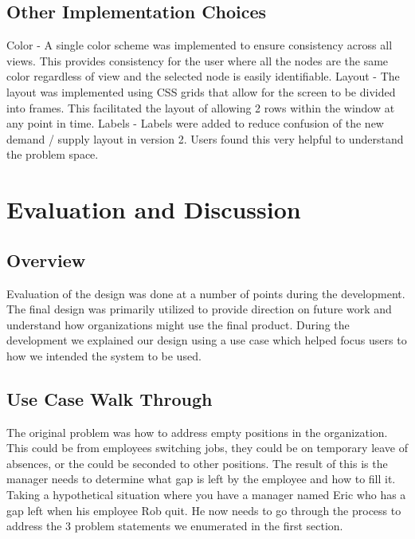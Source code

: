 \documentclass[journal]{vgtc}                %
\begin{document}
\subsection{Other Implementation Choices}
Color - A single color scheme was implemented to ensure consistency across all views.  This provides consistency for the user where all the nodes are the same color regardless of view and the selected node is easily identifiable.
Layout - The layout was implemented using CSS grids that allow for the screen to be divided into frames.  This facilitated the layout of allowing 2 rows within the window at any point in time.  
Labels - Labels were added to reduce confusion of the new demand / supply layout in version 2.  Users found this very helpful to understand the problem space.

\section{Evaluation and Discussion}

\subsection{Overview}
Evaluation of the design was done at a number of points during the development.  The final design was primarily utilized to provide direction on future work and understand how organizations might use the final product.  During the development we explained our design using a use case which helped focus users to how we intended the system to be used.

\subsection{Use Case Walk Through}
The original problem was how to address empty positions in the organization.  This could be from employees switching jobs, they could be on temporary leave of absences, or the could be seconded to other positions.  The result of this is the manager needs to determine what gap is left by the employee and how to fill it.  Taking a hypothetical situation where you have a manager named Eric who has a gap left when his employee Rob quit.  He now needs to go through the process to address the 3 problem statements we enumerated in the first section.
\end{document}
